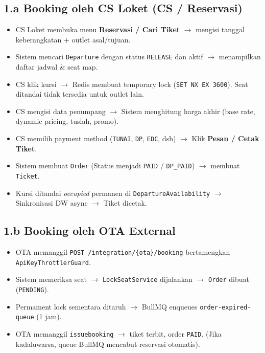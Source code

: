 \documentclass[11pt,a4paper]{article}
\begin{document}
\subsection{1.a Booking oleh CS Loket (CS / Reservasi)}
\begin{itemize}
    \item CS Loket membuka menu \textbf{Reservasi / Cari Tiket} $\rightarrow$ mengisi tanggal keberangkatan + outlet asal/tujuan.
    \item Sistem mencari \texttt{Departure} dengan status \texttt{RELEASE} dan aktif $\rightarrow$ menampilkan daftar jadwal \& seat map.
    \item CS klik kursi $\rightarrow$ Redis membuat temporary lock (\texttt{SET NX EX 3600}). Seat ditandai tidak tersedia untuk outlet lain.
    \item CS mengisi data penumpang $\rightarrow$ Sistem menghitung harga akhir (base rate, dynamic pricing, tuslah, promo).
    \item CS memilih payment method (\texttt{TUNAI}, \texttt{DP}, \texttt{EDC}, dsb) $\rightarrow$ Klik \textbf{Pesan / Cetak Tiket}.
    \item Sistem membuat \texttt{Order} (Status menjadi \texttt{PAID} / \texttt{DP\_PAID}) $\rightarrow$ membuat \texttt{Ticket}.
    \item Kursi ditandai \textit{occupied} permanen di \texttt{DepartureAvailability} $\rightarrow$ Sinkronisasi DW async $\rightarrow$ Tiket dicetak.
\end{itemize}

\subsection{1.b Booking oleh OTA External}
\begin{itemize}
    \item OTA memanggil \texttt{POST /integration/\{ota\}/booking} bertamengkan \texttt{ApiKeyThrottlerGuard}.
    \item Sistem memeriksa seat $\rightarrow$ \texttt{LockSeatService} dijalankan $\rightarrow$ \texttt{Order} dibuat (\texttt{PENDING}).
    \item Permament lock sementara ditaruh $\rightarrow$ BullMQ enqueues \texttt{order-expired-queue} (1 jam).
    \item OTA memanggil \texttt{issuebooking} $\rightarrow$ tiket terbit, order \texttt{PAID}. (Jika kadaluwarsa, queue BullMQ mencabut reservasi otomatis).
\end{itemize}
\end{document}
